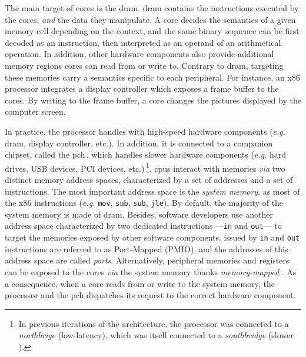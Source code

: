 The main target of cores \IOs is the \ac{dram}.
%
\ac{dram} contains the instructions executed by the cores, \emph{and} the data
they manipulate.
%
A core decides the semantics of a given memory cell depending on the context,
and the same binary sequence can be first decoded as an instruction, then
interpreted as an operand of an arithmetical operation.
%
In addition, other hardware components also provide additional memory regions
cores can read from or write to.
%
Contrary to \ac{dram}, \IOs targeting these memories carry a semantics specific
to each peripheral.
%
For instance, an x86 processor integrates a display controller which exposes a
frame buffer to the cores.
%
By writing to the frame buffer, a core changes the pictures displayed by the
computer screen.

In practice, the processor handles \IOs with high-speed hardware components
(\emph{e.g.} \ac{dram}, display controller, etc.).
%
In addition, it is connected to a companion chipset, called the
\ac{pch}\,\cite{turley2014introx86}, which handles slower hardware components
(\emph{e.g.}  hard drives, USB devices, PCI devices, etc.)\,\footnote{In
  previous iterations of the architecture, the processor was connected to a
  \emph{northbrige} (low-latency), which was itself connected to a
  \emph{southbridge} (slower \IOs).}.
%
\acp{cpu} interact with memories \emph{via} two distinct memory address spaces,
characterized by a set of addresses and a set of instructions.
%
The most important address space is the \emph{system memory}, as most of the x86
instructions (\emph{e.g.} \texttt{mov}, \texttt{sub}, \texttt{sub},
\texttt{jle}).
%
By default, the majority of the system memory is made of \ac{dram}.
%
Besides, software developers use another address space characterized by two
dedicated instructions ---\texttt{in} and \texttt{out}--- to target the memories
exposed by other software components.
%
\IOs issued by \texttt{in} and \texttt{out} instructions are referred to as
Port-Mapped \IOs (PMIO), and the addresses of this address space are called
\emph{ports}.
%
Alternatively, peripheral memories and registers can be exposed to the cores
\emph{via} the system memory thanks \emph{memory-mapped} \IOs.
%
As a consequence, when a core reads from or write to the system memory, the
processor and the \ac{pch} dispatches its request to the correct hardware
component.

